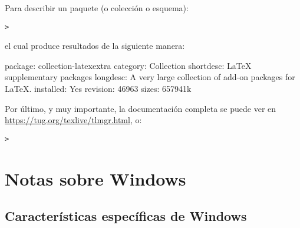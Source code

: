 \documentclass{article}
\begin{document}
Para describir un paquete (o colección o esquema):
\begin{alltt}
> 
\end{alltt}
el cual produce resultados de la siguiente manera:
\begin{fverbatim}
package:    collection-latexextra
category:   Collection
shortdesc:  LaTeX supplementary packages
longdesc:   A very large collection of add-on packages for LaTeX.
installed:  Yes
revision:   46963
sizes:      657941k
\end{fverbatim}

Por último, y muy importante, la documentación completa se puede ver en
\url{https://tug.org/texlive/tlmgr.html}, o:
\begin{alltt}
> 
\end{alltt}

\section{Notas sobre Windows}
\label{sec:windows}

\subsection{Características específicas de Windows}
\label{sec:winfeatures}
\end{document}

